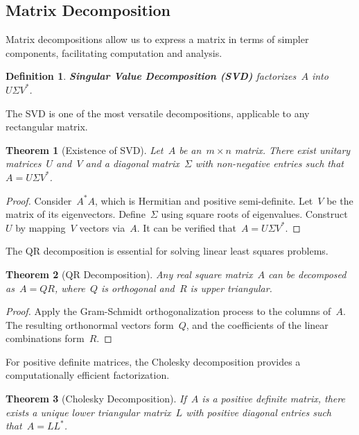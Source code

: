 \documentclass[12pt]{article}
\newtheorem{theorem}{Theorem}[section]
\newtheorem{definition}{Definition}[section]
\begin{document}
\subsection{Matrix Decomposition}

Matrix decompositions allow us to express a matrix in terms of simpler components, facilitating computation and analysis.

\begin{definition}
    \textbf{Singular Value Decomposition (SVD)} factorizes~$A$ into~$U \Sigma V^*$.
\end{definition}

The SVD is one of the most versatile decompositions, applicable to any rectangular matrix.

\begin{theorem}[Existence of SVD]
    Let~$A$ be an~$m \times n$ matrix. There exist unitary matrices~$U$ and~$V$ and a diagonal matrix~$\Sigma$ with non-negative entries such that~$A = U \Sigma V^*$.
\end{theorem}

\begin{proof}
    Consider~$A^* A$, which is Hermitian and positive semi-definite. Let~$V$ be the matrix of its eigenvectors. Define~$\Sigma$ using square roots of eigenvalues. Construct~$U$ by mapping~$V$ vectors via~$A$. It can be verified that~$A = U \Sigma V^*$.
\end{proof}

The QR decomposition is essential for solving linear least squares problems.

\begin{theorem}[QR Decomposition]
    Any real square matrix~$A$ can be decomposed as~$A = QR$, where~$Q$ is orthogonal and~$R$ is upper triangular.
\end{theorem}

\begin{proof}
    Apply the Gram-Schmidt orthogonalization process to the columns of~$A$. The resulting orthonormal vectors form~$Q$, and the coefficients of the linear combinations form~$R$.
\end{proof}

For positive definite matrices, the Cholesky decomposition provides a computationally efficient factorization.

\begin{theorem}[Cholesky Decomposition]
    If~$A$ is a positive definite matrix, there exists a unique lower triangular matrix~$L$ with positive diagonal entries such that~$A = L L^*$.
\end{theorem}
\end{document}

